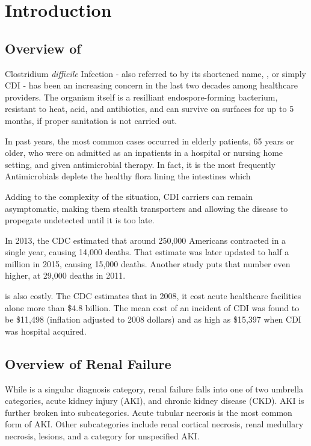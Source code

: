 \chapter{Introduction}

\section{Overview of \cdiff}

Clostridium \textit{difficile} Infection - also referred to by its shortened name, \cdiff, or simply CDI -
has been an increasing concern in the last two decades among healthcare providers. 
The organism itself is a resilliant endospore-forming bacterium, resistant to heat, acid, and antibiotics,
and can survive on surfaces for up to 5 months, if proper sanitation is not carried out. \cite{Gerding2008}

In past years, the most common \cdiff cases occurred in elderly patients, 65 years or older,
who were on admitted as an inpatients in a hospital or nursing home setting, and given antimicrobial therapy.
In fact, it is the most frequently 
Antimicrobials deplete the healthy flora lining the intestines which 

Adding to the complexity of the situation, CDI carriers can remain asymptomatic, making them stealth transporters
and allowing the disease to propegate undetected until it is too late. 

In 2013, the CDC estimated that around 250,000 Americans contracted \cdiff in a single year, causing 14,000 deaths.
That estimate was later updated to half a million in 2015, causing 15,000 deaths. \cite{CDC2018}
\cite{CDC2015} 
Another study puts that number even higher, at 29,000 deaths in 2011. 

\cdiff is also costly. The CDC estimates that in 2008, it cost acute healthcare facilities alone more than \$4.8 billion.
The mean cost of an incident of CDI was found to be \$11,498 (inflation adjusted to 2008 dollars)
and as high as \$15,397 when CDI was hospital acquired. \cite{Dubberke2012}


\section{Overview of Renal Failure}

While \cdiff is a singular diagnosis category, renal failure falls into one of two umbrella categories, acute kidney injury (AKI), 
and chronic kidney disease (CKD). AKI is further broken into subcategories. Acute tubular necrosis is the most common form of AKI.
Other subcategories include renal cortical necrosis, renal medullary necrosis, lesions, and a category for unspecified AKI. 

